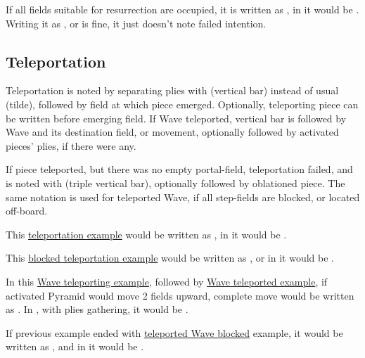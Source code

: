 If all fields suitable for resurrection are occupied, it is written as ,
in  it would be . Writing it as , or 
is fine, it just doesn't note failed intention.


\subsection*{Teleportation}
\label{sec:Appendix/Notation/Teleportation}

Teleportation is noted by separating plies with \alg{|} (vertical bar) instead of
usual \alg{\~{}} (tilde), followed by field at which piece emerged. Optionally,
teleporting piece can be written before emerging field. If Wave teleported, vertical
bar is followed by Wave and its destination field, or movement, optionally followed
by activated pieces' plies, if there were any.

If piece teleported, but there was no empty portal-field, teleportation failed,
and is noted with \alg{|||} (triple vertical bar), optionally followed by oblationed
piece. The same notation is used for teleported Wave, if all step-fields are blocked,
or located off-board.

This \hyperref[fig:scn_n_02_teleport_init]{teleportation example} would be written as
, in  it would be .

This \hyperref[fig:scn_n_03_teleport_move_2]{blocked teleportation example} would be
written as , or in  it would be .

In this \hyperref[fig:scn_n_04_teleport_move_3]{Wave teleporting example}, followed by
\hyperref[fig:scn_n_05_teleport_end]{Wave teleported example}, if activated Pyramid
would move 2 fields upward, complete move would be written as\newline
{}. In , with plies gathering, it would be\newline
\alg{[Ei11-g15]\~{}[Wg15-a18]|[Wr1-l4]\~{}[Al4-l6]}.

If previous example ended with
\hyperref[fig:scn_n_06_teleport_wave_blocked]{teleported Wave blocked} example,
it would be written as , and in  it would be
.

